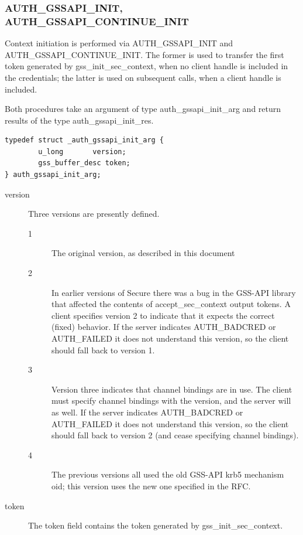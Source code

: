 \subsubsection{AUTH_GSSAPI_INIT, AUTH_GSSAPI_CONTINUE_INIT}

Context initiation is performed via AUTH_GSSAPI_INIT and
AUTH_GSSAPI_CONTINUE_INIT.  The former is used to transfer the first
token generated by gss_init_sec_context, when no client handle is
included in the credentials; the latter is used on subsequent calls,
when a client handle is included.

Both procedures take an argument of type auth_gssapi_init_arg and
return results of the type auth_gssapi_init_res.

\begin{verbatim}
typedef struct _auth_gssapi_init_arg {
        u_long       version;
        gss_buffer_desc token;
} auth_gssapi_init_arg;
\end{verbatim}

\begin{description}
\item[version]  Three versions are presently defined.

\begin{description}
\item[1] The original version, as described in this document

\item[2] In earlier versions of Secure there was a bug in the GSS-API
library that affected the contents of accept_sec_context output
tokens.  A client specifies version 2 to indicate that it expects the
correct (fixed) behavior.  If the server indicates AUTH_BADCRED or
AUTH_FAILED it does not understand this version, so the client should
fall back to version 1.

\item[3] Version three indicates that channel bindings are in use.
The client must specify channel bindings with the version, and the
server will as well.  If the server indicates AUTH_BADCRED or
AUTH_FAILED it does not understand this version, so the client should
fall back to version 2 (and cease specifying channel bindings).

\item[4] The previous versions all used the old GSS-API krb5 mechanism
oid; this version uses the new one specified in the RFC.
\end{description}

\item[token] The token field contains the token generated by
gss_init_sec_context.
\end{description}

